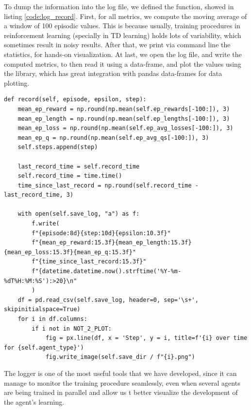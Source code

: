 To dump the information into the log file, we defined the  function, showed in listing \ref{code:log_record}. First, for all metrics, we compute the moving average of a window of 100 episodic values. This is because usually, training procedures in reinforcement learning (specially in TD learning) holds lots of variability, which sometimes result in noisy results. After that, we print via command line the statistics, for hands-on visualization. At last, we open the log file, and write the computed metrics, to then read it using a  data-frame, and plot the values using the  library, which has great integration with pandas data-frames for data plotting.

\begin{lstlisting}[caption={Record function, that saves the moving average statistics in the log file and plots the values of the statistics over the time-steps of the learning}, label={code:log_record}]
def record(self, episode, epsilon, step):
	mean_ep_reward = np.round(np.mean(self.ep_rewards[-100:]), 3)
	mean_ep_length = np.round(np.mean(self.ep_lengths[-100:]), 3)
	mean_ep_loss = np.round(np.mean(self.ep_avg_losses[-100:]), 3)
	mean_ep_q = np.round(np.mean(self.ep_avg_qs[-100:]), 3)
	self.steps.append(step)
	
	last_record_time = self.record_time
	self.record_time = time.time()
	time_since_last_record = np.round(self.record_time - last_record_time, 3)
	
	with open(self.save_log, "a") as f:
		f.write(
		f"{episode:8d}{step:10d}{epsilon:10.3f}"
		f"{mean_ep_reward:15.3f}{mean_ep_length:15.3f}{mean_ep_loss:15.3f}{mean_ep_q:15.3f}"
		f"{time_since_last_record:15.3f}"
		f"{datetime.datetime.now().strftime('%Y-%m-%dT%H:%M:%S'):>20}\n"
		)
	df = pd.read_csv(self.save_log, header=0, sep='\s+', skipinitialspace=True)
	for i in df.columns:
		if i not in NOT_2_PLOT:
			fig = px.line(df, x = 'Step', y = i, title=f'{i} over time for {self.agent_type}')
			fig.write_image(self.save_dir / f"{i}.png")
\end{lstlisting} 

The logger is one of the most useful tools that we have developed, since it can manage to monitor the training procedure seamlessly, even when several agents are being trained in parallel and allow us t better visualize the development of the agent's learning. 

